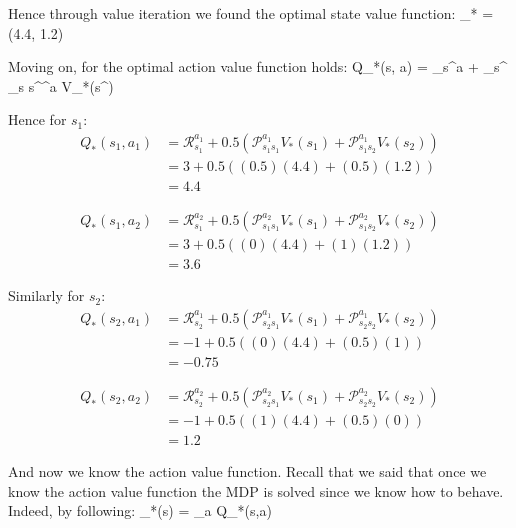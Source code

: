 Hence through value iteration we found the optimal state value function:
\bse
{}_* = (4.4, 1.2)
\ese

Moving on, for the optimal action value function holds:
\bse
Q_{*}(s, a) = _{s}^{a} + \gamma \sum_{s^{\prime}} _{s s^\prime}^{a} V_{*}(s^\prime)
\ese

Hence for $s_1$:
\begin{align*}
Q_{*}(s_1, a_1) & = \mathcal{R}_{s_1}^{a_1} + 0.5 \left(\mathcal{P}_{s_1 s_1}^{a_1} V_{*}(s_1) +
\mathcal{P}_{s_1 s_2}^{a_1} V_{*}(s_2) \right) \\
& =3 + 0.5 \left((0.5) (4.4) + (0.5) (1.2) \right) \\
& = 4.4
\end{align*}

\vspace{-15pt}

\begin{align*}
Q_{*}(s_1, a_2) & = \mathcal{R}_{s_1}^{a_2} + 0.5 \left(\mathcal{P}_{s_1 s_1}^{a_2} V_{*}(s_1) +
\mathcal{P}_{s_1 s_2}^{a_2} V_{*}(s_2) \right) \\
& = 3 + 0.5 \left((0) (4.4) + (1) (1.2) \right) \\
& = 3.6
\end{align*}

Similarly for $s_2$:
\begin{align*}
Q_{*}(s_2, a_1) & = \mathcal{R}_{s_2}^{a_1} + 0.5 \left(\mathcal{P}_{s_2 s_1}^{a_1} V_{*}(s_1) +
\mathcal{P}_{s_2 s_2}^{a_1} V_{*}(s_2) \right) \\
& = -1 + 0.5 \left((0) (4.4) + (0.5) (1) \right) \\
& = -0.75
\end{align*}

\vspace{-15pt}

\begin{align*}
Q_{*}(s_2, a_2) & = \mathcal{R}_{s_2}^{a_2} + 0.5 \left(\mathcal{P}_{s_2 s_1}^{a_2} V_{*}(s_1) +
\mathcal{P}_{s_2 s_2}^{a_2} V_{*}(s_2) \right) \\
& = -1 + 0.5 \left((1) (4.4) + (0.5) (0) \right) \\
& = 1.2
\end{align*}

And now we know the action value function. Recall that we said that once we know the action value function the MDP is
solved since we know how to behave. Indeed, by following:
\bse
\pi_*(s) = \argmax_{a} Q_*(s,a)
\ese

